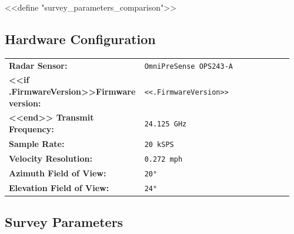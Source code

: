 <<define "survey_parameters_comparison">>
\subsection*{Hardware Configuration}

{
\small
\setlength{\tabcolsep}{2pt}
\renewcommand{\arraystretch}{1.00}
\begin{tabular}{>{\raggedright\arraybackslash\bfseries}p{0.44\linewidth}>{\raggedright\arraybackslash}p{0.52\linewidth}}
Radar Sensor: & \texttt{OmniPreSense OPS243-A} \\
<<if .FirmwareVersion>>Firmware version: & \texttt{<<.FirmwareVersion>>} \\
<<end>>
Transmit Frequency: & \texttt{24.125 GHz} \\
Sample Rate: & \texttt{20 kSPS} \\
Velocity Resolution: & \texttt{0.272 mph} \\
Azimuth Field of View: & \texttt{20°} \\
Elevation Field of View: & \texttt{24°} \\
\end{tabular}
}

\subsection*{Survey Parameters}

